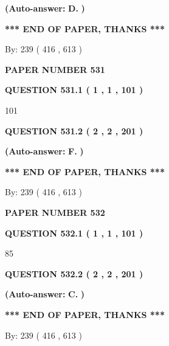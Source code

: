 \documentclass[12pt]{article}
\begin{document}
 
{\textbf{(Auto-answer:}}
{\textbf{\large{
D.}}}
{\textbf{)}}
 
 
   
   
   
   
\vspace{1.0in} 
{\textbf{\large{ *** END OF PAPER, THANKS *** }}} 
   
   
\hspace{1.0in} By: 
 239 ( 416 ,  613 )
   
   
   
   
\newpage 
\setcounter{page}{ 
   531001 } 
   
   
 {\textbf{ \Large{ PAPER NUMBER  531  }}}
   
   
   
   
  
  
{\textbf{\large{QUESTION
531.1 
 ( 1 , 1 , 101 )
}}}

101
  
  
{\textbf{\large{QUESTION
531.2 
 ( 2 , 2 , 201 )
}}}
 
 
{\textbf{(Auto-answer:}}
{\textbf{\large{
F.}}}
{\textbf{)}}
 
 
   
   
   
   
\vspace{1.0in} 
{\textbf{\large{ *** END OF PAPER, THANKS *** }}} 
   
   
\hspace{1.0in} By: 
 239 ( 416 ,  613 )
   
   
   
   
\newpage 
\setcounter{page}{ 
   532001 } 
   
   
 {\textbf{ \Large{ PAPER NUMBER  532  }}}
   
   
   
   
  
  
{\textbf{\large{QUESTION
532.1 
 ( 1 , 1 , 101 )
}}}

85
  
  
{\textbf{\large{QUESTION
532.2 
 ( 2 , 2 , 201 )
}}}
 
 
{\textbf{(Auto-answer:}}
{\textbf{\large{
C.}}}
{\textbf{)}}
 
 
   
   
   
   
\vspace{1.0in} 
{\textbf{\large{ *** END OF PAPER, THANKS *** }}} 
   
   
\hspace{1.0in} By: 
 239 ( 416 ,  613 )
   
   
   
\end{document}
